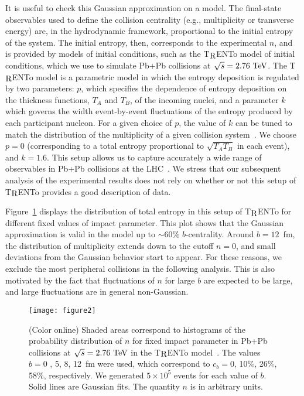 \documentclass[aps,prc,twocolumn,superscriptaddress,showpacs,floatfix,nofootinbib]{revtex4-1}
\newcommand{\trento}{T$\mathrel{\protect\raisebox{-2.1pt}{R}}$ENTo}
\begin{document}
It is useful to check this Gaussian approximation on a model.
The final-state observables used to define the collision centrality (e.g., multiplicity or transverse energy) are, in the hydrodynamic framework, proportional to the initial entropy of the system.
The initial entropy, then, corresponds to the experimental $n$, and is provided by models of initial conditions, such as the \trento{} model of initial conditions, which we use to simulate Pb+Pb collisions at $~\sqrt[]{s}=2.76~{\rm TeV}$.
The \trento{} model is a parametric model in which the entropy deposition is regulated by two parameters: $p$, which specifies the dependence of entropy deposition on the thickness functions, $T_A$ and $T_B$, of the incoming nuclei, and a parameter $k$ which governs the width event-by-event fluctuations of the entropy produced by each participant nucleon.
For a given choice of $p$, the value of $k$ can be tuned to match the distribution of the multiplicity of a given collision system~\cite{Moreland:2014oya}.
We choose $p=0$ (corresponding to a total entropy proportional to $\sqrt{T_AT_B}$ in each event), and $k=1.6$. 
This setup allows us to capture accurately a wide range of observables in Pb+Pb collisions at the LHC~\cite{Bernhard:2016tnd,Giacalone:2017uqx}.
We stress that our subsequent analysis of the experimental results does not rely on whether or not this setup of \trento{} provides a good description of data.

Figure~\ref{fig:gaussian} displays the distribution of total entropy in this setup of \trento{} for different fixed values of impact parameter.
This plot shows that the Gaussian approximation is valid in the model up to $\sim60\%$ $b$-centrality.
Around $b=12$~fm, the distribution of multiplicity extends down to the cutoff $n=0$, and small deviations from the Gaussian behavior start to appear. 
For these reasons, we exclude the most peripheral collisions in the following analysis. 
This is also motivated by the fact that fluctuations of $n$ for large $b$ are expected to be large, and large fluctuations are in general non-Gaussian.
\begin{figure}[t!]
\begin{center}
\texttt{[image: figure2]} 
\end{center}
\caption{(Color online) Shaded areas correspond to histograms of the probability distribution of $n$ for fixed impact parameter in Pb+Pb collisions at $~\sqrt[]{s}=2.76~{\rm TeV}$ in the \trento{} model~\cite{Moreland:2014oya}. The values $b=0$ , 5, 8, 12~fm were used, which correspond to $c_b=0$, 10\%, 26\%, 58\%, respectively. We generated $5\times 10^5$ events for each value of $b$. Solid lines are Gaussian fits. The quantity $n$ is in arbitrary units.
}
\label{fig:gaussian}
\end{figure}
\end{document}
